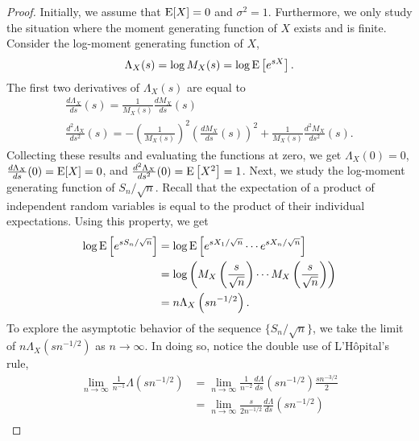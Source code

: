 \begin{proof}
Initially, we assume that $\mathrm{E} [X] = 0$ and $\sigma^2 = 1$.
Furthermore, we only study the situation where the moment generating function of $X$ exists and is finite.
Consider the log-moment generating function of $X$,
\begin{equation*}
\Lambda_X (s) = \log M_X (s)
= \log \mathrm{E} \left[ e^{sX} \right] .
\end{equation*}
The first two derivatives of $\Lambda_X (s)$ are equal to
\begin{gather*}
\frac{d \Lambda_X}{ds} (s)
= \frac{1}{M_X (s)} \frac{d M_X}{ds} (s) \\
\frac{d^2 \Lambda_X}{ds^2} (s)
= - \left( \frac{1}{M_X (s)} \right)^2 \left( \frac{d M_X}{ds} (s) \right)^2
+ \frac{1}{M_X (s)} \frac{d^2 M_X}{ds^2} (s) .
\end{gather*}
Collecting these results and evaluating the functions at zero, we get $\Lambda_X (0) = 0$, $\frac{d \Lambda_X}{ds} (0) = \mathrm{E} [X] = 0$, and $\frac{d^2 \Lambda_X}{ds^2} (0) = \mathrm{E} \left[ X^2 \right] = 1$.
Next, we study the log-moment generating function of $S_n / \sqrt{n}$.
Recall that the expectation of a product of independent random variables is equal to the product of their individual expectations.
Using this property, we get
\begin{equation*}
\begin{split}
\log \mathrm{E} \left[ e^{s S_n / \sqrt{n} } \right]
&= \log \mathrm{E} \left[ e^{s X_1 / \sqrt{n} }
\cdots e^{s X_n / \sqrt{n} } \right] \\
&= \log \left( M_X \left( \frac{s}{\sqrt{n}} \right)
\cdots M_X \left( \frac{s}{\sqrt{n}} \right) \right) \\
&= n \Lambda_X \left( s n^{-1/2} \right) .
\end{split}
\end{equation*}
To explore the asymptotic behavior of the sequence $\{ S_n / \sqrt{n} \}$, we take the limit of $n \Lambda_X \left( s n^{-1/2} \right)$ as $n \rightarrow \infty$.
In doing so, notice the double use of L'H\^{o}pital's rule,
\begin{equation*}
\begin{split}
\lim_{n \rightarrow \infty} \frac{1}{n^{-1}} \Lambda \left( s n^{-1/2} \right)
&= \lim_{n \rightarrow \infty} \frac{1}{n^{-2}}
\frac{d \Lambda}{ds} \left( s n^{-1/2} \right) \frac{s n^{-3/2}}{2} \\
&= \lim_{n \rightarrow \infty} \frac{s}{2 n^{-1/2}}
\frac{d \Lambda}{ds} \left( s n^{-1/2} \right) \\

\end{split}
\end{equation*}
\end{proof}
